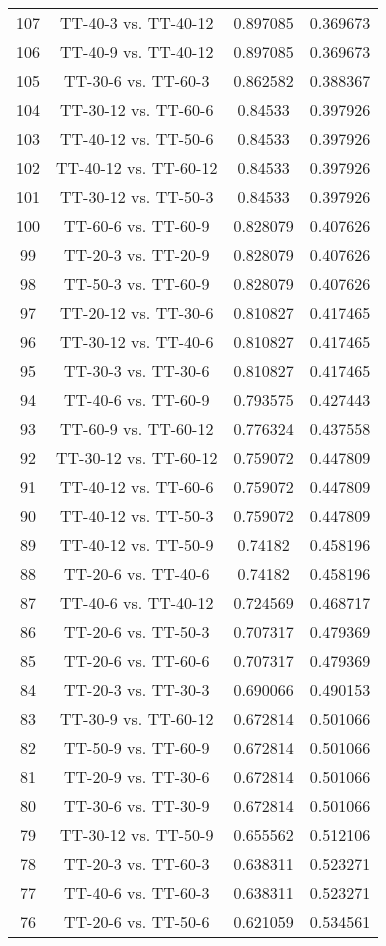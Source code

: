\documentclass[a4paper,10pt]{article}
\begin{document}
\begin{landscape}
\begin{table}[!htp]
\begin{tabular}{cccc}
107&TT-40-3 vs. TT-40-12&0.897085&0.369673\\
106&TT-40-9 vs. TT-40-12&0.897085&0.369673\\
105&TT-30-6 vs. TT-60-3&0.862582&0.388367\\
104&TT-30-12 vs. TT-60-6&0.84533&0.397926\\
103&TT-40-12 vs. TT-50-6&0.84533&0.397926\\
102&TT-40-12 vs. TT-60-12&0.84533&0.397926\\
101&TT-30-12 vs. TT-50-3&0.84533&0.397926\\
100&TT-60-6 vs. TT-60-9&0.828079&0.407626\\
99&TT-20-3 vs. TT-20-9&0.828079&0.407626\\
98&TT-50-3 vs. TT-60-9&0.828079&0.407626\\
97&TT-20-12 vs. TT-30-6&0.810827&0.417465\\
96&TT-30-12 vs. TT-40-6&0.810827&0.417465\\
95&TT-30-3 vs. TT-30-6&0.810827&0.417465\\
94&TT-40-6 vs. TT-60-9&0.793575&0.427443\\
93&TT-60-9 vs. TT-60-12&0.776324&0.437558\\
92&TT-30-12 vs. TT-60-12&0.759072&0.447809\\
91&TT-40-12 vs. TT-60-6&0.759072&0.447809\\
90&TT-40-12 vs. TT-50-3&0.759072&0.447809\\
89&TT-40-12 vs. TT-50-9&0.74182&0.458196\\
88&TT-20-6 vs. TT-40-6&0.74182&0.458196\\
87&TT-40-6 vs. TT-40-12&0.724569&0.468717\\
86&TT-20-6 vs. TT-50-3&0.707317&0.479369\\
85&TT-20-6 vs. TT-60-6&0.707317&0.479369\\
84&TT-20-3 vs. TT-30-3&0.690066&0.490153\\
83&TT-30-9 vs. TT-60-12&0.672814&0.501066\\
82&TT-50-9 vs. TT-60-9&0.672814&0.501066\\
81&TT-20-9 vs. TT-30-6&0.672814&0.501066\\
80&TT-30-6 vs. TT-30-9&0.672814&0.501066\\
79&TT-30-12 vs. TT-50-9&0.655562&0.512106\\
78&TT-20-3 vs. TT-60-3&0.638311&0.523271\\
77&TT-40-6 vs. TT-60-3&0.638311&0.523271\\
76&TT-20-6 vs. TT-50-6&0.621059&0.534561\\

\end{tabular}
\end{table}
\end{landscape}
\end{document}

